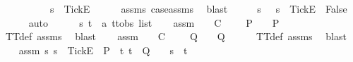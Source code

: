 \begin{isabellebody}
\ \ \isamarkupfalse%
\isanewline
\ \ \isamarkupfalse%
\ \isamarkupfalse%
\ {\isachardoublequoteopen}{\isasymsigma}\ {\isacharequal}\ s{\isacharprime}{\isacharprime}\ {\isacharat}\ {\isacharbrackleft}{\isacharbrackleft}Tick{\isacharbrackright}\isactrlsub E{\isacharbrackright}{\isachardoublequoteclose}\isanewline
\ \ \ \ \isamarkupfalse%
\ assms{\isacharparenleft}{}{\isacharparenright}\ case{\isacharunderscore}assms{\isacharparenleft}{}{\isacharparenright}\ \isamarkupfalse%
\ blast\isanewline
\ \ \isamarkupfalse%
\ \isamarkupfalse%
\ {\isachardoublequoteopen}{\isasymforall}s{\isachardot}\ {\isasymsigma}\ {\isasymnoteq}\ s\ {\isacharat}\ {\isacharbrackleft}{\isacharbrackleft}Tick{\isacharbrackright}\isactrlsub E{\isacharbrackright}\ {\isasymLongrightarrow}\ False{\isachardoublequoteclose}\isanewline
\ \ \ \ \isamarkupfalse%
\ auto\isanewline
{}\isamarkupfalse%
\isanewline
\ \ \isamarkupfalse%
\ {\isasymrho}\ {\isasymsigma}\ s\ t\ {\isacharcolon}{\isacharcolon}\ {\isachardoublequoteopen}{\isacharprime}a\ ttobs\ list{\isachardoublequoteclose}\isanewline
\ \ \isamarkupfalse%
\ assm{}{\isacharcolon}\ {\isachardoublequoteopen}{\isasymforall}{\isasymrho}\ {\isasymsigma}{\isachardot}\ {\isasymrho}\ {\isasymlesssim}\isactrlsub C\ {\isasymsigma}\ {\isasymand}\ {\isasymsigma}\ {\isasymin}\ P\ {\isasymlongrightarrow}\ {\isasymrho}\ {\isasymin}\ P{\isachardoublequoteclose}\isanewline
\ \ \ \ \isamarkupfalse%
\ TT{}{\isacharunderscore}def\ assms{\isacharparenleft}{}{\isacharparenright}\ \isamarkupfalse%
\ blast\isanewline
\ \ \isamarkupfalse%
\ assm{}{\isacharcolon}\ {\isachardoublequoteopen}{\isasymforall}{\isasymrho}\ {\isasymsigma}{\isachardot}\ {\isasymrho}\ {\isasymlesssim}\isactrlsub C\ {\isasymsigma}\ {\isasymand}\ {\isasymsigma}\ {\isasymin}\ Q\ {\isasymlongrightarrow}\ {\isasymrho}\ {\isasymin}\ Q{\isachardoublequoteclose}\isanewline
\ \ \ \ \isamarkupfalse%
\ TT{}{\isacharunderscore}def\ assms{\isacharparenleft}{}{\isacharparenright}\ \isamarkupfalse%
\ blast\isanewline
\ \ \isamarkupfalse%
\ assm{}{\isacharcolon}\ {\isachardoublequoteopen}{\isasymforall}s{\isachardot}\ s\ {\isacharat}\ {\isacharbrackleft}{\isacharbrackleft}Tick{\isacharbrackright}\isactrlsub E{\isacharbrackright}\ {\isasymin}\ P\ {\isasymlongrightarrow}\ {\isacharparenleft}{\isasymforall}t{\isachardot}\ t\ {\isasymin}\ Q\ {\isasymlongrightarrow}\ {\isasymrho}\ {\isasymnoteq}\ s\ {\isacharat}\ t{\isacharparenright}{\isachardoublequoteclose}\isanewline

\end{isabellebody}
